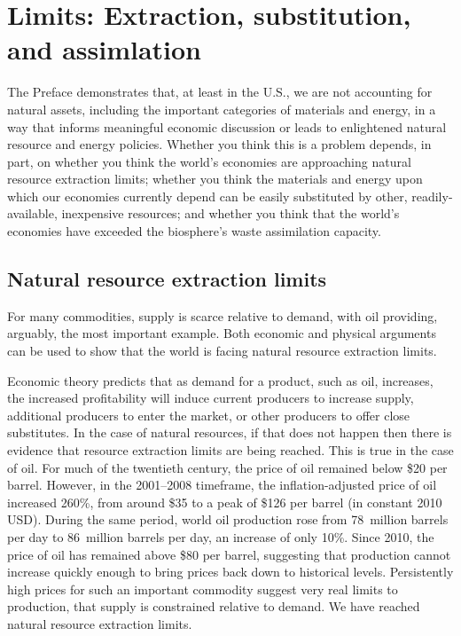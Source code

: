 \section{Limits: Extraction, substitution, and assimlation}
\label{sec:limits}

The Preface demonstrates that, at least in the U.S., 
we are not accounting for natural assets, 
including the important categories of materials and energy,
in a way that informs meaningful economic discussion or
leads to enlightened natural resource and energy policies.
Whether you think this is a problem depends, in part, on 
whether you think the world's economies are approaching 
	natural resource extraction limits;
whether you think the materials and energy upon which our economies currently depend
	can be easily substituted by other, readily-available, inexpensive resources; and
whether you think that the world's economies have exceeded 
	the biosphere's waste assimilation capacity.


\subsection{Natural resource extraction limits}
\label{sub:natural_resource_extraction_limits}

For many commodities, supply is scarce relative to demand, 
with oil providing, arguably, the most important example. 
Both economic and physical arguments can be used to show that the world is facing
natural resource extraction limits.

Economic theory predicts that as demand for a product, such as oil, increases,
the increased profitability will induce current producers to increase supply, 
additional producers to enter the market,
or other producers to offer close substitutes. 
In the case of natural resources, if that does not happen
then there is evidence that resource extraction limits are being reached.
This is true in the case of oil.
For much of the twentieth century, the price of oil remained below \$20 per barrel.
However, in the 2001--2008 timeframe,
the inflation-adjusted price of oil increased 260\%,
from around \$35 to a peak of \$126 per barrel 
(in constant 2010 USD).
During the same period,
world oil production rose from 
78~million barrels per day to 86~million barrels per day,
an increase of only 10\%.\cite{EIA2014}
Since 2010, the price of oil has remained above \$80 per barrel,
suggesting that production cannot increase quickly enough to bring prices
back down to historical levels.
Persistently high prices for such an important commodity
suggest very real limits to production, 
that supply is constrained relative to demand. 
We have reached natural resource extraction limits.

